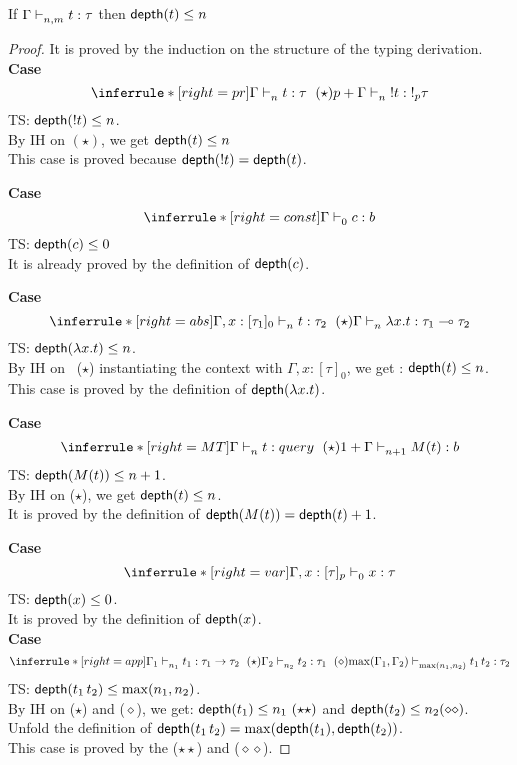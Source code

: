 \documentclass{article}
\begin{document}
\clearpage
\begin{lemma} 
	\label{lem:2}
	If $\Gamma \mathrel{\vdash_{n,m}^{} {t} : {\tau}} $ then $\mathsf{depth}(t) \leq n$\\
\end{lemma}
\begin{proof}
 It is proved by the induction on the structure of the typing derivation.\\
 \noindent \textbf{Case} 
 \[
 \inferrule*[right = pr]
   {\Gamma \jtype{n}{}{t}{\tau} ~(\star) } 
   {p + \Gamma \jtype{n}{}{!t}{!_p \tau}  }
 \]
 TS: $\mathsf{depth}(!t) \leq n $.\\
 By IH on $(\star)$, we get $\mathsf{depth}(t) \leq n $ \\
 This case is proved because $\mathsf{depth}(!t)= \mathsf{depth}(t)$.
 
 \noindent \textbf{Case} 
 \[
  \inferrule*[right = const]
   {\empty}
   {\Gamma \jtype{0}{}{c}{b}  }
 \]
 TS: $\mathsf{depth}(c) \leq 0$ \\
 It is already proved by the definition of $\mathsf{depth}(c)$.
 
  \noindent \textbf{Case} 
  \[
   \inferrule*[right = abs]
   {\Gamma, x: [\tau_1]_{0} \jtype{n}{}{t}{\tau_2} ~(\star)}
   { \Gamma \jtype{n}{}{\abs{x}{t}}{\tau_1 \multimap \tau_2}  }
  \]
  TS: $\mathsf{depth}(\mathrel { \lambda {x} . {t} }) \leq n $. \\
  By IH on ~($\star$) instantiating the context with $\Gamma, x: [\tau]_0 $, we get : $\mathsf{depth}(t) \leq n $. \\
    This case is proved by the definition of $\mathsf{depth}(\mathrel { \lambda {x} . {t} })$.
  
   \noindent \textbf{Case} 
  \[
   \inferrule*[ right = MT ]
   {\Gamma \jtype{n}{}{t}{query} ~ (\star) }
   {1 + \Gamma \jtype{n+1}{}{M(t)}{b}  }
  \]
   TS: $\mathsf{depth}( M(t) ) \leq n+1 $. \\
   By IH on ($\star$), we get $\mathsf{depth}(t) \leq n $. \\
   It is proved by the definition of $\mathsf{depth}(M(t)) = \mathsf{depth}(t) + 1 $.
   
   \noindent \textbf{Case} 
   \[
    \inferrule*[ right = var]
   {\empty}
   {\Gamma, x:[\tau]_p \jtype{0}{}{x}{\tau}  } 
   \]
   TS: $\mathsf{depth}(x) \leq 0$. \\
   It is proved by the definition of $\mathsf{depth}(x)$. \\
   
    \noindent \textbf{Case} 
    \[
     \inferrule*[ right = app ]
   {\Gamma_1 \jtype{n_1}{}{t_1}{\tau_1 \rightarrow \tau_2} ~ (\star) \\ \Gamma_2 \jtype{n_2}{}{t_2}{\tau_1}~(\diamond)}
   { \max(\Gamma_1,\Gamma_2) \jtype{\max(n_1,n_2)}{}{\app{t_1}{t_2}}{\tau_2}  }
    \]
    TS: $\mathsf{depth}(\mathrel{ {t_1} \, {t_2} }) \leq \max(n_1,n_2) $. \\
    By IH on ($\star$) and ($\diamond$), we get: $\depth(t_1) \leq n_1~(\star\star) $ and $\mathsf{depth}(t_2) \leq n_2 (\diamond\diamond)$. \\
    Unfold the definition of $\mathsf{depth}(\mathrel{ {t_1} \, {t_2} }) = \max(\mathsf{depth}(t_1), \mathsf{depth}(t_2))$.\\
    This case is proved by the ($\star\star$) and ($\diamond\diamond$).
    

\end{proof}
\end{document}
